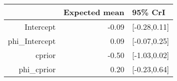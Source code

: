 \begin{tabular}{rrl}
  \hline
 & Expected mean & 95\% CrI \\ 
  \hline
Intercept & -0.09 & [-0.28,0.11] \\ 
  phi\_Intercept & 0.09 & [-0.07,0.25] \\ 
  cprior & -0.50 & [-1.03,0.02] \\ 
  phi\_cprior & 0.20 & [-0.23,0.64] \\ 
   \hline
\end{tabular}

